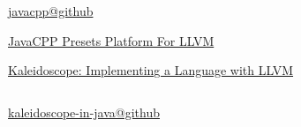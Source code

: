 
\begin{frame}{}
	\begin{center}
	\end{center}
\end{frame}

\begin{frame}{}
	\begin{center}
		\href{https://github.com/bytedeco/javacpp}{javacpp@github}

		\vspace{0.30cm}
		\href{https://mvnrepository.com/artifact/org.bytedeco/llvm-platform/15.0.3-1.5.8}{JavaCPP Presets Platform For LLVM}

		\vspace{0.50cm}
	\end{center}
\end{frame}

\begin{frame}{}
\end{frame}



\begin{frame}{}
	\begin{center}
		\href{https://llvm.org/docs/tutorial/}{Kaleidoscope: Implementing a Language with LLVM}
	\end{center}

	\begin{columns}
	\end{columns}

	\vspace{0.20cm}
	\begin{center}
		\href{https://github.com/courses-at-nju-by-hfwei/kaleidoscope-in-java}{kaleidoscope-in-java@github}
	\end{center}
\end{frame}
